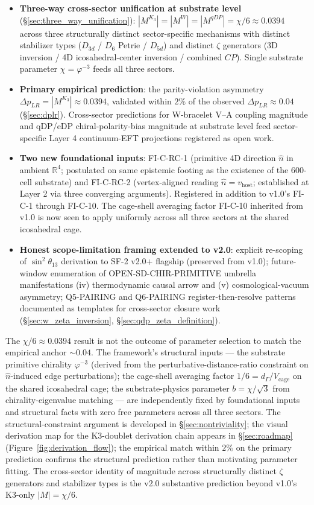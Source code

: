 \documentclass[11pt,letterpaper]{article}
\newcommand{\phig}{\varphi}
\newcommand{\Kthree}{\ensuremath{K_3}}
\newcommand{\DeltapLR}{\Delta p_{LR}}
\newcommand{\Dsix}{D_6}
\begin{document}
\begin{itemize}
    \item \textbf{Three-way cross-sector unification at substrate level} (\S\ref{sec:three_way_unification}): $|M^{\Kthree}| = |M^W| = |M^{qDP}| = \chi/6 \approx 0.0394$ across three structurally distinct sector-specific mechanisms with distinct stabilizer types ($D_{3d}$ / $\Dsix$ Petrie / $D_{5d}$) and distinct $\zeta$ generators (3D inversion / 4D icosahedral-center inversion / combined $CP$). Single substrate parameter $\chi = \phig^{-3}$ feeds all three sectors.
    \item \textbf{Primary empirical prediction}: the parity-violation asymmetry $\DeltapLR = |M^{\Kthree}| \approx 0.0394$, validated within $2\%$ of the observed $\DeltapLR \approx 0.04$ (\S\ref{sec:dplr}). Cross-sector predictions for W-bracelet V--A coupling magnitude and qDP/eDP chiral-polarity-bias magnitude at substrate level feed sector-specific Layer 4 continuum-EFT projections registered as open work.
    \item \textbf{Two new foundational inputs}: FI-C-RC-1 (primitive 4D direction $\hat{n}$ in ambient $\mathbb{R}^4$; postulated on same epistemic footing as the existence of the 600-cell substrate) and FI-C-RC-2 (vertex-aligned reading $\hat{n} = v_{\text{host}}$; established at Layer 2 via three converging arguments). Registered in addition to v1.0's FI-C-1 through FI-C-10. The cage-shell averaging factor FI-C-10 inherited from v1.0 is now seen to apply uniformly across all three sectors at the shared icosahedral cage.
    \item \textbf{Honest scope-limitation framing extended to v2.0}: explicit re-scoping of $\sin^2\theta_{13}$ derivation to SF-2 v2.0+ flagship (preserved from v1.0); future-window enumeration of OPEN-SD-CHIR-PRIMITIVE umbrella manifestations (iv) thermodynamic causal arrow and (v) cosmological-vacuum asymmetry; Q5-PAIRING and Q6-PAIRING register-then-resolve patterns documented as templates for cross-sector closure work (\S\ref{sec:w_zeta_inversion}, \S\ref{sec:qdp_zeta_definition}).
\end{itemize}

The $\chi/6 \approx 0.0394$ result is not the outcome of parameter selection to match the empirical anchor $\sim 0.04$. The framework's structural inputs --- the substrate primitive chirality $\phig^{-3}$ (derived from the perturbative-distance-ratio constraint on $\hat{n}$-induced edge perturbations); the cage-shell averaging factor $1/6 = d_\Gamma/V_{\text{cage}}$ on the shared icosahedral cage; the substrate-physics parameter $b = \chi/\sqrt{3}$ from chirality-eigenvalue matching --- are independently fixed by foundational inputs and structural facts with zero free parameters across all three sectors. The structural-constraint argument is developed in \S\ref{sec:nontriviality}; the visual derivation map for the K3-doublet derivation chain appears in \S\ref{sec:roadmap} (Figure~\ref{fig:derivation_flow}); the empirical match within $2\%$ on the primary prediction confirms the structural prediction rather than motivating parameter fitting. The cross-sector identity of magnitude across structurally distinct $\zeta$ generators and stabilizer types is the v2.0 substantive prediction beyond v1.0's K3-only $|M| = \chi/6$.
\end{document}
